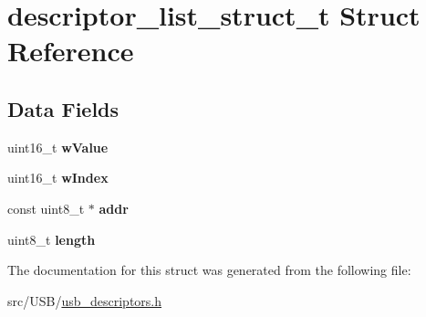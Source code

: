 \hypertarget{structdescriptor__list__struct__t}{}\section{descriptor\+\_\+list\+\_\+struct\+\_\+t Struct Reference}
\label{structdescriptor__list__struct__t}
\subsection*{Data Fields}
\begin{DoxyCompactItemize}
\item 
uint16\+\_\+t {\bfseries w\+Value}\hypertarget{structdescriptor__list__struct__t_a7383d0165ad8eab48aa239c005199121}{}\label{structdescriptor__list__struct__t_a7383d0165ad8eab48aa239c005199121}

\item 
uint16\+\_\+t {\bfseries w\+Index}\hypertarget{structdescriptor__list__struct__t_adc578ce35d89d52deba61ee6f312f177}{}\label{structdescriptor__list__struct__t_adc578ce35d89d52deba61ee6f312f177}

\item 
const uint8\+\_\+t $\ast$ {\bfseries addr}\hypertarget{structdescriptor__list__struct__t_a079342946e8cb22db575423e3470c55c}{}\label{structdescriptor__list__struct__t_a079342946e8cb22db575423e3470c55c}

\item 
uint8\+\_\+t {\bfseries length}\hypertarget{structdescriptor__list__struct__t_ab2b3adeb2a67e656ff030b56727fd0ac}{}\label{structdescriptor__list__struct__t_ab2b3adeb2a67e656ff030b56727fd0ac}

\end{DoxyCompactItemize}


The documentation for this struct was generated from the following file\+:\begin{DoxyCompactItemize}
\item 
src/\+U\+S\+B/\hyperlink{usb__descriptors_8h}{usb\+\_\+descriptors.\+h}\end{DoxyCompactItemize}
